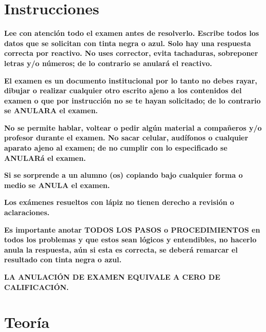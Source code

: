 \documentclass[]{article}
\begin{document}
\section*{\small Instrucciones} 
\vspace{-4mm}
\begin{enumerate}[nolistsep]
{\footnotesize
\item \textbf{Lee con atenci\'on todo el examen antes de resolverlo. Escribe todos los
datos que se solicitan con tinta negra o azul. Solo hay una respuesta correcta
por reactivo. No uses corrector, evita tachaduras, sobreponer letras y/o
n\'umeros; de lo contrario se anular\'a el reactivo.}

\item \textbf{El examen es un documento institucional por lo tanto no debes rayar,
dibujar o realizar cualquier otro escrito ajeno a los contenidos del examen o
que por instrucci\'on no se te hayan solicitado; de lo contrario se ANULARA el
examen.}

\item \textbf{No se permite hablar, voltear o pedir alg\'un material a compañeros y/o
profesor durante el examen. No sacar celular, aud\'ifonos o cualquier aparato
ajeno al examen; de no cumplir con lo especificado se ANULAR\'a el examen.}

\item \textbf{Si se sorprende a un alumno (os) copiando bajo cualquier forma o medio se
ANULA el examen.}

\item \textbf{Los ex\'amenes resueltos con l\'apiz no tienen derecho a revisi\'on o
aclaraciones.}

\item \textbf{Es importante anotar TODOS LOS PASOS o PROCEDIMIENTOS en todos los
problemas y que estos sean l\'ogicos y entendibles, no hacerlo anula la
respuesta, a\'un si esta es correcta, se deber\'a  remarcar el resultado con
tinta negra o azul.} }
\end{enumerate}
\vspace{-3mm}
\begin{center}
{\small \textbf{LA ANULACI\'ON DE EXAMEN EQUIVALE A CERO DE CALIFICACI\'ON.}}
\end{center}

\section*{Teor\'ia} %
\label{sec:teor'ia}
\end{document}
